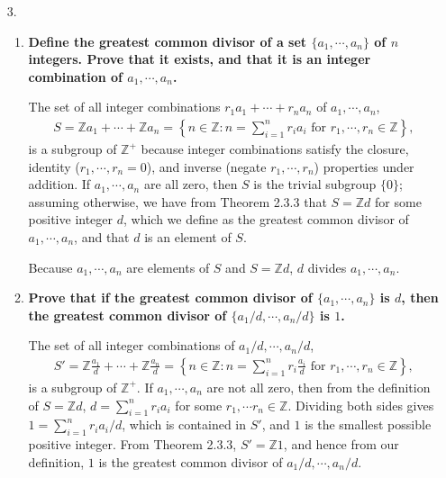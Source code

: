 \documentclass[a4paper,12pt]{article}
\begin{document}
\begin{enumerate}
    \item[3.]
        \begin{enumerate}
            \item
                \boldmath
                \textbf{Define the greatest common divisor of a set $\{ a_1, \cdots, a_n \}$ of $n$ integers. Prove that it exists, and that it is an integer combination of $a_1, \cdots, a_n$.} \par
                \unboldmath
                The set of all integer combinations $r_1 a_1 + \cdots + r_n a_n$ of $a_1, \cdots, a_n$,
                \begin{align*}
                    S = \mathbb{Z}a_1 + \cdots + \mathbb{Z}a_n = \left\{ n \in \mathbb{Z} : n = \sum_{i = 1}^n r_i a_i \text{ for } r_1, \cdots, r_n \in \mathbb{Z} \right\},
                \end{align*}
                is a subgroup of $\mathbb{Z}^+$ because integer combinations satisfy the closure, identity ($r_1, \cdots, r_n = 0$), and inverse (negate $r_1, \cdots, r_n$) properties under addition. If $a_1, \cdots, a_n$ are all zero, then $S$ is the trivial subgroup $\{ 0 \}$; assuming otherwise, we have from Theorem 2.3.3 that $S = \mathbb{Z}d$ for some positive integer $d$, which we define as the greatest common divisor of $a_1, \cdots, a_n$, and that $d$ is an element of $S$. \par
                Because $a_1, \cdots, a_n$ are elements of $S$ and $S = \mathbb{Z}d$, $d$ divides $a_1, \cdots, a_n$.

            \item
                \boldmath
                \textbf{Prove that if the greatest common divisor of $\{ a_1, \cdots, a_n \}$ is $d$, then the greatest common divisor of $\{ a_1/d, \cdots, a_n/d \}$ is $1$.} \par
                \unboldmath
                The set of all integer combinations of $a_1/d, \cdots, a_n/d$,
                \begin{align*}
                    S' = \mathbb{Z} \frac{a_1}{d} + \cdots + \mathbb{Z} \frac{a_n}{d} = \left\{ n \in \mathbb{Z} : n = \sum_{i = 1}^n r_i \frac{a_i}{d} \text{ for } r_1, \cdots, r_n \in \mathbb{Z} \right\},
                \end{align*}
                is a subgroup of $\mathbb{Z}^+$. If $a_1, \cdots, a_n$ are not all zero, then from the definition of $S = \mathbb{Z}d$, $d = \sum_{i = 1}^n r_i a_i$ for some $r_1, \cdots r_n \in \mathbb{Z}$. Dividing both sides gives $1 = \sum_{i = 1}^n r_i a_i/d$, which is contained in $S'$, and $1$ is the smallest possible positive integer. From Theorem 2.3.3, $S' = \mathbb{Z}1$, and hence from our definition, $1$ is the greatest common divisor of $a_1/d, \cdots, a_n/d$.
        \end{enumerate}
\end{enumerate}
\end{document}

